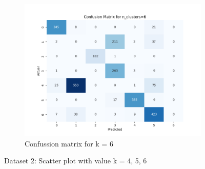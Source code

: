 \documentclass[12pt]{report}
\begin{document}
\begin{figure}[H]
\begin{subfigure}{.6\textwidth}
			\includegraphics[width=.9\linewidth]{../K-means/Output/Dataset2/confusionMatrix_k=6.png}
			\caption{Confussion matrix for k = 6}
			\label{Dataset2ConfusionMatrixk6}
		\end{subfigure}
		\caption{Dataset 2: Scatter plot with value k = 4, 5, 6}
		\label{Dataset2ConfussionMatrix456}
	\end{figure}
\end{document}
